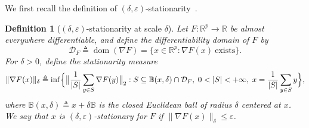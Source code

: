\documentclass[11pt, letterpaper, oneside, reqno]{amsart}
\newcommand{\R}{\mathbb{R}}
\newcommand{\Let}{\triangleq}
\newtheorem{definition}{Definition}
\begin{document}
We first recall the definition of $(\delta,\varepsilon)$-stationarity~\cite[Definitions~4--5]{ref:cutkosky2023optimal}.
\begin{definition}[$(\delta,\varepsilon)$-stationarity at scale $\delta$]
\label{def:goldstein}
Let $F:\R^p\to\R$ be almost everywhere differentiable, and define the differentiability domain of $F$ by
\[
\mathcal D_F \Let \operatorname{dom}(\nabla F)=\{x\in\R^p:\nabla F(x)\ \text{exists}\}.
\]
For $\delta>0$, define the stationarity measure
\[
\|\nabla F(x)\|_{\delta}
\Let
\inf\Bigl\{
\bigl\|\frac{1}{|S|}\sum_{y\in S}\nabla F(y)\bigr\|_2:
S\subseteq \mathbb{B}(x,\delta)\cap \mathcal D_F,\; 0<|S|<+\infty,\; x=\frac{1}{|S|}\sum_{y\in S}y
\Bigr\},
\]
where $\mathbb{B}(x,\delta)\Let x+\delta\mathbb B$ is the closed Euclidean ball of radius $\delta$ centered at $x$.
We say that $x$ is $(\delta,\varepsilon)$-stationary for $F$ if $\|\nabla F(x)\|_{\delta}\le \varepsilon$.
\end{definition}
\end{document}
